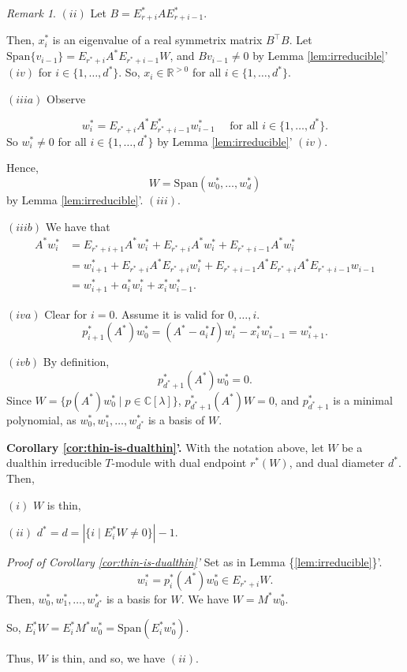 \documentclass[
]{book}
\theoremstyle{definition}
\theoremstyle{definition}
\theoremstyle{definition}
\theoremstyle{definition}
\theoremstyle{remark}
\newtheorem*{remark}{Remark}
\begin{document}
\begin{remark}
\((ii)\) Let \(B = E^*_{r+i}AE^*_{r+i-1}\).

Then, \(x^*_i\) is an eigenvalue of a real symmetrix matrix \(B^\top B\).
Let \(\mathrm{Span}\{v_{i-1}\} = E_{r^*+i}A^*E_{r^*+i-1}W\), and \(Bv_{i-1}\neq 0\) by Lemma \ref{lem:irreducible}' \((iv)\) for \(i\in \{1, \ldots, d^*\}\). So, \(x_i\in \mathbb{R}^{>0}\) for all \(i\in \{1, \ldots, d^*\}\).

\((iiia)\) Observe

\[w^*_i = E_{r^*+i}A^*E^*_{r^*+i-1}w^*_{i-1} \quad \text{ for all }i\in \{1, \ldots, d^*\}.\]
So \(w^*_i \neq 0\) for all \(i\in \{1, \ldots, d^*\}\) by Lemma \ref{lem:irreducible}' \((iv)\).

Hence,
\[W = \mathrm{Span}(w^*_0, \ldots, w^*_d)\]
by Lemma \ref{lem:irreducible}'. \((iii)\).

\((iiib)\) We have that
\begin{align}
A^*w^*_i & = E_{r^*+i+1}A^*w^*_i + E_{r^*+i}A^*w^*_i + E_{r^*+i-1}A^*w^*_i\\
& = w^*_{i+1} + E_{r^*+i}A^*E_{r^*+i}w^*_i + E_{r^*+i-1}A^*E_{r^*+i}A^*E_{r^*+i-1}w_{i-1}\\
& = w^*_{i+1} + a^*_iw^*_{i} + x^*_iw^*_{i-1}.
\end{align}

\((iva)\) Clear for \(i=0\). Assume it is valid for \(0, \ldots, i\).
\[p^*_{i+1}(A^*)w^*_0 = (A^*-a^*_iI)w^*_i - x^*_iw^*_{i-1} = w^*_{i+1}.\]

\((ivb)\) By definition,
\[p^*_{d^*+1}(A^*)w^*_0 = 0.\]
Since \(W = \{p(A^*)w^*_0\mid p\in \mathbb{C}[\lambda]\}\), \(p^*_{d^*+1}(A^*)W = 0\), and \(p^*_{d^*+1}\) is a minimal polynomial, as \(w^*_0, w^*_1, \ldots, w^*_{d^*}\) is a basis of \(W\).

\textbf{Corollary \ref{cor:thin-is-dualthin}'.}
With the notation above, let \(W\) be a dualthin irreducible \(T\)-module with dual endpoint \(r^*(W)\), and dual diameter \(d^*\). Then,

\((i)\) \(W\) is thin,

\((ii)\) \(d^* = d = |\{i\mid E^*_iW\neq 0\}| -1\).

\emph{Proof of Corollary \ref{cor:thin-is-dualthin}'}
Set as in Lemma \{\ref{lem:irreducible}\}'.
\[w^*_i = p^*_i(A^*)w^*_0 \in E_{r^*+i}W.\]
Then, \(w^*_0, w^*_1, \ldots, w^*_{d^*}\) is a basis for \(W\). We have \(W = M^*w^*_0\).

So, \(E^*_iW = E^*_iM^*w^*_0 = \mathrm{Span}(E^*_iw^*_0)\).

Thus, \(W\) is thin, and so, we have \((ii)\).
\end{remark}
\end{document}
